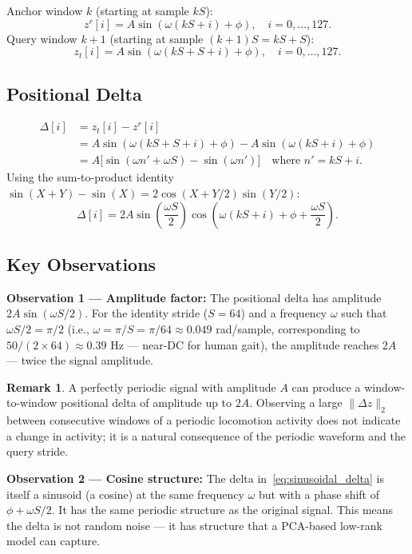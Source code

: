 \documentclass[11pt, a4paper]{article}
\theoremstyle{definition}
\newtheorem{remark}{Remark}[section]
\theoremstyle{plain}
\begin{document}
Anchor window $k$ (starting at sample $kS$):
\[
  z^r[i] = A \sin(\omega(kS + i) + \phi), \quad i = 0, \ldots, 127.
\]
Query window $k+1$ (starting at sample $(k+1)S = kS + S$):
\[
  z_t[i] = A \sin(\omega(kS + S + i) + \phi), \quad i = 0, \ldots, 127.
\]

\subsection{Positional Delta}

\begin{align}
  \Delta[i] &= z_t[i] - z^r[i] \\
  &= A \sin(\omega(kS + S + i) + \phi) - A \sin(\omega(kS + i) + \phi) \\
  &= A \bigl[\sin(\omega n' + \omega S) - \sin(\omega n')\bigr]
  \quad \text{where } n' = kS + i.
\end{align}
Using the sum-to-product identity $\sin(X + Y) - \sin(X) = 2\cos(X + Y/2)\sin(Y/2)$:
\begin{equation}\label{eq:sinusoidal_delta}
  \Delta[i] = 2A \sin\!\left(\frac{\omega S}{2}\right)
              \cos\!\left(\omega(kS + i) + \phi + \frac{\omega S}{2}\right).
\end{equation}

\subsection{Key Observations}

\textbf{Observation 1 — Amplitude factor:}
The positional delta has amplitude $2A\sin(\omega S / 2)$.
For the identity stride ($S = 64$) and a frequency $\omega$ such that
$\omega S / 2 = \pi/2$ (i.e., $\omega = \pi/S = \pi/64 \approx 0.049$ rad/sample,
corresponding to $50 / (2 \times 64) \approx 0.39$ Hz — near-DC for human gait),
the amplitude reaches $2A$ — twice the signal amplitude.

\begin{remark}
  A perfectly periodic signal with amplitude $A$ can produce a window-to-window
  positional delta of amplitude up to $2A$. Observing a large $\|\Delta z\|_2$
  between consecutive windows of a periodic locomotion activity does not indicate
  a change in activity; it is a natural consequence of the periodic waveform and
  the query stride.
\end{remark}

\textbf{Observation 2 — Cosine structure:}
The delta in~\eqref{eq:sinusoidal_delta} is itself a sinusoid (a cosine) at the same
frequency $\omega$ but with a phase shift of $\phi + \omega S/2$. It has the same
periodic structure as the original signal. This means the delta is not random noise
— it has structure that a PCA-based low-rank model can capture.
\end{document}

